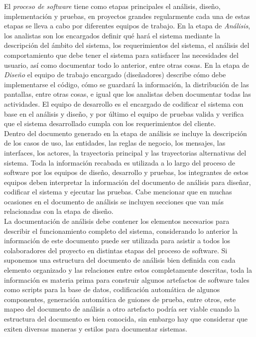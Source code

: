 El \emph{proceso de software} tiene como etapas principales el análisis, diseño, implementación y pruebas, 
en proyectos grandes regularmente cada una de estas etapas se lleva a cabo por diferentes equipos
de trabajo. En la etapa de \emph{Análisis}, los analistas son los encargados definir qué hará el sistema
mediante la descripción del ámbito del sistema, los requerimientos del sistema, el análisis del comportamiento que debe tener el sistema para satisfacer 
las necesidades del usuario, así como documentar todo lo anterior, entre otras cosas. En la etapa de \emph{Diseño} el equipo de trabajo encargado
(diseñadores) describe cómo debe implementarse el código, cómo se guardará la información, la distribución de las pantallas, entre otras cosas, e igual
que los analistas deben documentar todas las actividades. El equipo de desarrollo es el encargado de codificar el sistema con base en el análisis 
y diseño, y por último el equipo de pruebas valida y verifica que el sistema desarrollado cumpla con los requerimientos del cliente.\\

Dentro del documento generado en la etapa de análisis se incluye la descripción de los casos de uso, las entidades, 
las reglas de negocio, los mensajes, las interfaces, los actores, la trayectoria principal
y las trayectorias alternativas del sistema. Toda la información recabada es utilizada a lo largo del proceso de software 
por los equipos de diseño, desarrollo y pruebas, los integrantes de estos
equipos deben interpretar la información del documento de análisis para diseñar, codificar el sistema y ejecutar las pruebas. 
Cabe mencionar que en muchas ocasiones en el documento de análisis se incluyen secciones que van más relacionadas con la etapa de diseño.\\

La documentación de análisis debe contener los elementos necesarios para describir el funcionamiento completo del sistema, considerando lo anterior
la información de este documento puede ser utilizada para asistir a todos los colaboradores del proyecto en distintas etapas
del proceso de software. Si suponemos una estructura del documento de análisis
bien definida con cada elemento organizado y las relaciones entre estos completamente descritas, toda la información es materia prima para construir algunos
artefactos de software tales como scripts para la base de datos, codificación automática de algunos componentes, generación automática de guiones de prueba, entre otros,
este mapeo del documento de análisis a otro artefacto podría ser viable cuando la estructura del documento es bien conocida, 
sin embargo hay que considerar que exiten diversas maneras y estilos para 
documentar sistemas.\\

